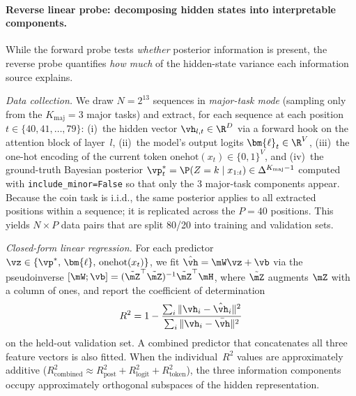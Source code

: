 \paragraph{Reverse linear probe: decomposing hidden states into interpretable
components.}
While the forward probe tests \emph{whether} posterior information is present,
the reverse probe quantifies \emph{how much} of the hidden-state variance each
information source explains.

\emph{Data collection.}
We draw $N = 2^{13}$ sequences in \emph{major-task mode} (sampling only from the
$K_{\mathrm{maj}} = 3$ major tasks) and extract, for each sequence at each
position $t \in \{40, 41, \ldots, 79\}$:
(i)~the hidden vector $\vh_{l,t} \in \R^D$ via a forward hook on the attention
block of layer~$l$,
(ii)~the model's output logits $\bm{\ell}_t \in \R^V$,
(iii)~the one-hot encoding of the current token
$\mathrm{onehot}(x_t) \in \{0,1\}^V$,
and (iv)~the ground-truth Bayesian posterior
$\vp^*_t = \P(Z = k \mid x_{1:t}) \in \Delta^{K_{\mathrm{maj}}-1}$
computed with \texttt{include\_minor=False} so that only the 3 major-task
components appear.
Because the coin task is i.i.d., the same posterior applies to all extracted
positions within a sequence; it is replicated across the $P = 40$ positions.
This yields $N \times P$ data pairs that are split 80/20 into training and
validation sets.

\emph{Closed-form linear regression.}
For each predictor $\vz \in \{\vp^*,\, \bm{\ell},\, \mathrm{onehot}(x_t)\}$,
we fit
$\hat{\vh} = \mW \vz + \vb$
via the pseudoinverse $[\mW; \vb] = (\tilde{\mZ}^\top \tilde{\mZ})^{-1}
\tilde{\mZ}^\top \mH$,
where $\tilde{\mZ}$ augments $\mZ$ with a column of ones, and report the
coefficient of determination
\[
  R^2 = 1 - \frac{\sum_i \|\vh_i - \hat{\vh}_i\|^2}
                  {\sum_i \|\vh_i - \bar{\vh}\|^2}
\]
on the held-out validation set.
A combined predictor that concatenates all three feature vectors is also fitted.
When the individual~$R^2$ values are approximately additive
($R^2_{\mathrm{combined}} \approx R^2_{\mathrm{post}} + R^2_{\mathrm{logit}}
  + R^2_{\mathrm{token}}$),
the three information components occupy approximately orthogonal subspaces
of the hidden representation.

